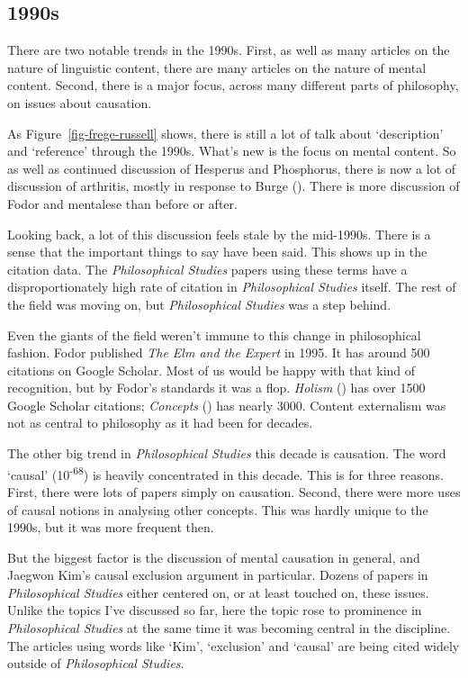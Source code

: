 \documentclass[
  10pt,
  letterpaper,
  DIV=11,
  numbers=noendperiod,
  twoside]{scrartcl}
\begin{document}
\subsection{1990s}\label{sec-1990s-articles}

There are two notable trends in the 1990s. First, as well as many
articles on the nature of linguistic content, there are many articles on
the nature of mental content. Second, there is a major focus, across
many different parts of philosophy, on issues about causation.

As Figure~\ref{fig-frege-russell} shows, there is still a lot of talk
about `description' and `reference' through the 1990s. What's new is the
focus on mental content. So as well as continued discussion of Hesperus
and Phosphorus, there is now a lot of discussion of arthritis, mostly in
response to Burge (). There is
more discussion of Fodor and mentalese than before or after.

Looking back, a lot of this discussion feels stale by the mid-1990s.
There is a sense that the important things to say have been said. This
shows up in the citation data. The \emph{Philosophical Studies} papers
using these terms have a disproportionately high rate of citation in
\emph{Philosophical Studies} itself. The rest of the field was moving
on, but \emph{Philosophical Studies} was a step behind.

Even the giants of the field weren't immune to this change in
philosophical fashion. Fodor published \emph{The Elm and the Expert} in
1995. It has around 500 citations on Google Scholar. Most of us would be
happy with that kind of recognition, but by Fodor's standards it was a
flop. \emph{Holism} () has over 1500 Google Scholar citations; \emph{Concepts}
() has nearly 3000. Content
externalism was not as central to philosophy as it had been for decades.

The other big trend in \emph{Philosophical Studies} this decade is
causation. The word `causal' (10\textsuperscript{-68}) is heavily
concentrated in this decade. This is for three reasons. First, there
were lots of papers simply on causation. Second, there were more uses of
causal notions in analysing other concepts. This was hardly unique to
the 1990s, but it was more frequent then.

But the biggest factor is the discussion of mental causation in general,
and Jaegwon Kim's causal exclusion argument in particular. Dozens of
papers in \emph{Philosophical Studies} either centered on, or at least
touched on, these issues. Unlike the topics I've discussed so far, here
the topic rose to prominence in \emph{Philosophical Studies} at the same
time it was becoming central in the discipline. The articles using words
like `Kim', `exclusion' and `causal' are being cited widely outside of
\emph{Philosophical Studies}.
\end{document}
